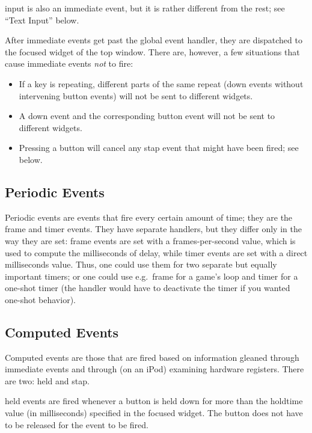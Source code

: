 \documentclass[12pt,letterpaper]{report}
\begin{document}
{\sf input} is also an immediate event, but it is rather different from the rest; see ``Text Input'' below.

After immediate events get past the global event handler, they are dispatched to the focused widget
of the top window. There are, however, a few situations that cause immediate events \emph{not} to fire:
\begin{itemize}
\item If a key is repeating, different parts of the same repeat ({\sf down} events without intervening {\sf button} events)
will not be sent to different widgets.
\item A {\sf down} event and the corresponding {\sf button} event will not be sent to different widgets.
\item Pressing a button will cancel any {\sf stap} event that might have been fired; see below.
\end{itemize}

\subsection{Periodic Events}
Periodic events are events that fire every certain amount of time; they are the {\sf frame} and
{\sf timer} events. They have separate handlers, but they
differ only in the way they are set: {\sf frame} events are set with a frames-per-second value,
which is used to compute the milliseconds of delay, while {\sf timer} events are set with a direct
milliseconds value. Thus, one could use them for two separate but equally important timers; or one
could use e.g.~{\sf frame} for a game's loop and {\sf timer} for a one-shot timer (the handler
would have to deactivate the timer if you wanted one-shot behavior).

\subsection{Computed Events}
Computed events are those that are fired based on information gleaned through immediate events
and through (on an iPod) examining hardware registers. There are two: {\sf held} and {\sf stap}.

{\sf held} events are fired whenever a button is held down for more than the {\sf holdtime} value (in
milliseconds) specified in the focused widget. The button does not have to be released for the
event to be fired.
\end{document}
